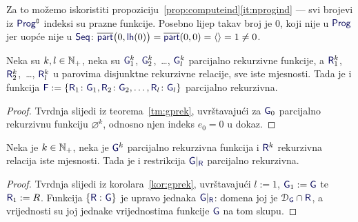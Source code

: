 Za to možemo iskoristiti propoziciju~\ref{prop:computeind}\eqref{it:nprogind} --- svi brojevi iz $\f{Prog}\kompl$ indeksi su prazne funkcije. Posebno lijep takav broj je $0$, koji nije u $\f{Prog}$ jer uopće nije u $\f{Seq}$: $\overline{\f{part}}\bigl(0,\f{lh}(0)\bigr)=\overline{\f{part}}(0,0)=\langle\rangle=1\ne0$.

\begin{korolar}[{name=[{teorem o grananju, parcijalno rekurzivna verzija, bez "inače"}]}]\label{kor:gprek}
Neka su $k,l\in{\mathbb N}_+$, neka su $\f G_1^k$, $\f G_2^k$,~\ldots, $\f G_l^k$ parcijalno rekurzivne funkcije, a $\f R_1^k$, $\f R_2^k$,~\ldots, $\f R_l^k$ u parovima disjunktne rekurzivne relacije, sve iste mjesnosti. Tada je i funkcija $\f F:=\{\f R_1\colon\f G_1,\f R_2\colon\f G_2,\dotsc,\f R_l\colon\f G_l\}$ parcijalno rekurzivna.
\end{korolar}
\begin{proof}
Tvrdnja slijedi iz teorema~\ref{tm:gprek}, uvrštavajući za $\f G_0$ parcijalno rekurzivnu funkciju $\varnothing^k$, odnosno njen indeks $e_0=0$ u dokaz.
\end{proof}

\begin{korolar}[{name=[restrikcija na rekurzivan skup čuva parcijalnu rekurzivnost]}]\label{kor:restrprek}
Neka je $k\in{\mathbb N}_+$, neka je $\f G^k$ parcijalno rekurzivna funkcija i $\f R^k$ rekurzivna relacija iste mjesnosti. Tada je i restrikcija $\f G|_{\f R}$ parcijalno rekurzivna.
\end{korolar}
\begin{proof}
Tvrdnja slijedi iz korolara~\ref{kor:gprek}, uvrštavajući $l:=1$, $\f G_1:=\f G$ te $\f R_1:=R$. Funkcija $\{\f R\,\colon\f G\}$ je upravo jednaka $\f G|_{\f R}$: domena joj je $\dom{\f G}\cap\f R$, a vrijednosti su joj jednake vrijednostima funkcije $\f G$ na tom skupu.
\end{proof}

